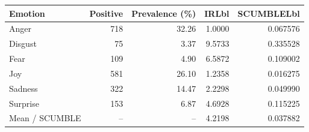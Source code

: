 \begin{tabular}{lrrrr}
\toprule
Emotion & Positive & Prevalence (\%) & IRLbl & SCUMBLELbl \\
\midrule
Anger & 718 & 32.26 & 1.0000 & 0.067576 \\
Disgust & 75 & 3.37 & 9.5733 & 0.335528 \\
Fear & 109 & 4.90 & 6.5872 & 0.109002 \\
Joy & 581 & 26.10 & 1.2358 & 0.016275 \\
Sadness & 322 & 14.47 & 2.2298 & 0.049990 \\
Surprise & 153 & 6.87 & 4.6928 & 0.115225 \\
Mean / SCUMBLE & -- & -- & 4.2198 & 0.037882 \\
\bottomrule
\end{tabular}
